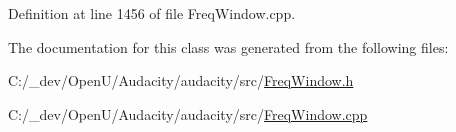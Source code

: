 Definition at line 1456 of file Freq\+Window.\+cpp.



The documentation for this class was generated from the following files\+:\begin{DoxyCompactItemize}
\item 
C\+:/\+\_\+dev/\+Open\+U/\+Audacity/audacity/src/\hyperlink{_freq_window_8h}{Freq\+Window.\+h}\item 
C\+:/\+\_\+dev/\+Open\+U/\+Audacity/audacity/src/\hyperlink{_freq_window_8cpp}{Freq\+Window.\+cpp}\end{DoxyCompactItemize}
